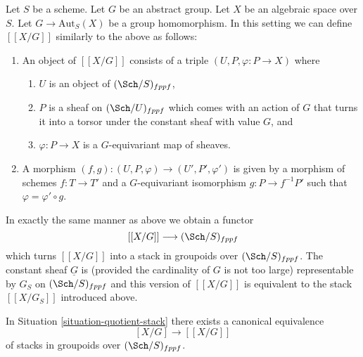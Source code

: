 \begin{remark}
\label{remark-X-mod-G-group}
Let $S$ be a scheme.
Let $G$ be an abstract group.
Let $X$ be an algebraic space over $S$.
Let $G \to \text{Aut}_S(X)$ be a group homomorphism.
In this setting we can define $[[X/G]]$ similarly
to the above as follows:
\begin{enumerate}
\item An object of $[[X/G]]$ consists of a triple
$(U, P, \varphi : P \to X)$ where
\begin{enumerate}
\item $U$ is an object of $(\Sch/S)_{fppf}$,
\item $P$ is a sheaf on $(\Sch/U)_{fppf}$ which comes
with an action of $G$ that turns it into a torsor under the constant
sheaf with value $G$, and
\item $\varphi : P \to X$ is a $G$-equivariant map of sheaves.
\end{enumerate}
\item A morphism
$(f, g) : (U, P, \varphi) \to (U', P', \varphi')$
is given by a morphism of schemes $f : T \to T'$
and a $G$-equivariant isomorphism
$g : P \to f^{-1}P'$ such that $\varphi = \varphi' \circ g$.
\end{enumerate}
In exactly the same manner as above we obtain a functor
$$
[[X/G]] \longrightarrow (\Sch/S)_{fppf}
$$
which turns $[[X/G]]$ into a stack in groupoids over $(\Sch/S)_{fppf}$.
The constant sheaf $\underline{G}$ is (provided the cardinality of $G$ is
not too large) representable by $G_S$ on $(\Sch/S)_{fppf}$
and this version of $[[X/G]]$ is equivalent to the stack
$[[X/G_S]]$ introduced above.
\end{remark}

\begin{proposition}
\label{proposition-equal-quotient-stacks}
In
Situation \ref{situation-quotient-stack}
there exists a canonical equivalence
$$
[X/G] \longrightarrow [[X/G]]
$$
of stacks in groupoids over $(\Sch/S)_{fppf}$.
\end{proposition}

